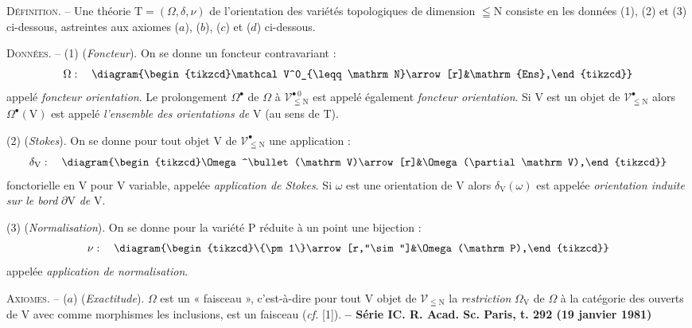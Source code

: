 \textsc{Définition}. -- Une théorie $\mathrm T=(\Omega,\delta,\nu)$ de l'orientation des variétés topologiques de dimension $\leqq\mathrm N$ consiste en les données (1), (2) et (3) ci-dessous, astreintes aux axiomes ($a$), ($b$), ($c$) et ($d$) ci-dessous.

\textsc{Données}. -- (1) (\textit{Foncteur}). On se donne un foncteur contravariant :
\[
\Omega:\quad\diagram{\begin{tikzcd}\mathcal V^0_{\leqq\mathrm N}\arrow[r]&\mathrm{Ens},\end{tikzcd}}
\]
appelé \textit{foncteur orientation}. Le prolongement $\Omega^\bullet$ de $\Omega$ à $\mathcal V^{\bullet\,0}_{\leqq\mathrm N}$ est appelé également \textit{foncteur orientation}. Si $\mathrm V$ est un objet de $\mathcal V^\bullet_{\leqq\mathrm N}$ alors $\Omega^\bullet(\mathrm V)$ est appelé \textit{l'ensemble des orientations de} $\mathrm V$ (au sens de $\mathrm T$).

(2) (\textit{Stokes}). On se donne pour tout objet $\mathrm V$ de $\mathcal V^\bullet_{\leqq\mathrm N}$ une application :
\[
\delta_{\mathrm V}:\quad\diagram{\begin{tikzcd}\Omega^\bullet(\mathrm V)\arrow[r]&\Omega(\partial\mathrm V),\end{tikzcd}}
\]
fonctorielle en $\mathrm V$ pour $\mathrm V$ variable, appelée \textit{application de Stokes}. Si $\omega$ est une orientation de $\mathrm V$ alors $\delta_{\mathrm V}(\omega)$ est appelée \textit{orientation induite sur le bord} $\partial\mathrm V$ \textit{de} $\mathrm V$.

(3) (\textit{Normalisation}). On se donne pour la variété $\mathrm P$ réduite à un point une bijection :
\[
\nu:\quad\diagram{\begin{tikzcd}\{\pm1\}\arrow[r,"\sim"]&\Omega(\mathrm P),\end{tikzcd}}
\]
appelée \textit{application de normalisation}.

\textsc{Axiomes}. -- ($a$) (\textit{Exactitude}). $\Omega$ est un « faisceau », c'est-à-dire pour tout $\mathrm V$ objet de $\mathcal V_{\leqq\mathrm N}$ la \textit{restriction} $\Omega_{\mathrm V}$ de $\Omega$ à la catégorie des ouverts de $\mathrm V$ avec comme morphismes les inclusions, est un faisceau (\textit{cf.} [1]).
\textbf{ -- Série I}\hfill\textbf{C. R. Acad. Sc. Paris, t. 292 (19 janvier 1981)}

